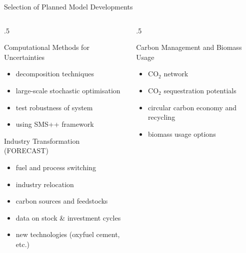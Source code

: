\documentclass[10pt,aspectratio=169,dvipsnames]{beamer}
\begin{document}
\begin{frame}{Selection of Planned Model Developments}
	\begin{columns}[T] %
		\begin{column}{.5\textwidth}
			\begin{minipage}[t][.45\textheight]{\linewidth}
				\begin{alertblock}{Computational Methods for Uncertainties}
					\begin{itemize}
						\item decomposition techniques
						\item large-scale stochastic optimisation
						\item test robustness of system
						\item using SMS++ framework
					\end{itemize}
				\end{alertblock}
			\end{minipage}

			\vspace{0.03\textheight} %

			\begin{minipage}[t][.45\textheight]{\linewidth}
				\begin{alertblock}{Industry Transformation (FORECAST)}
					\begin{itemize}
						\item fuel and process switching
						\item industry relocation
						\item carbon sources and feedstocks
						\item data on stock \& investment cycles
						\item new technologies (oxyfuel cement, etc.)
					\end{itemize}
				\end{alertblock}
			\end{minipage}
		\end{column}

		\begin{column}{.5\textwidth}
			\begin{minipage}[t][.45\textheight]{\linewidth}
				\begin{alertblock}{Carbon Management and Biomass Usage}
					\begin{itemize}
						\item CO$_2$ network
						\item CO$_2$ sequestration potentials
						\item circular carbon economy and recycling
						\item biomass usage options
					\end{itemize}
				\end{alertblock}
			\end{minipage}


\end{column}
\end{columns}
\end{frame}
\end{document}
